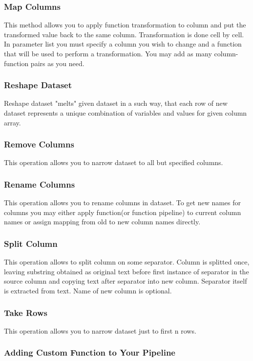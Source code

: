\documentclass[USenglish]{article}
\begin{document}
\subsubsection{Map Columns}
This method allows you to apply function transformation to column and put the transformed value back to the same column. Transformation is done cell by cell. In parameter list you must specify a column you wish to change and a function that will be used to perform a transformation. You may add as many column-function pairs as you need. 
\subsubsection{Reshape Dataset}
Reshape dataset "melts" given dataset in a such way, that each row of new dataset represents a unique combination of variables and values for given column array.
\subsubsection{Remove Columns}
This operation allows you to narrow dataset to all but specified columns.
\subsubsection{Rename Columns}
This operation allows you to rename columns in dataset. To get new names for columns you may either apply function(or function pipeline) to current column names or assign mapping from old to new column names directly.
\subsubsection{Split Column}
This operation allows to split column on some separator. Column is splitted once, leaving substring obtained as original text before first instance of separator in the source column and copying text after separator into new column. Separator itself is extracted from text. Name of new column is optional.
\subsubsection{Take Rows}
This operation allows you to narrow dataset just to first n rows.
\subsubsection{Adding Custom Function to Your Pipeline \label{customfunction}}
\end{document}
